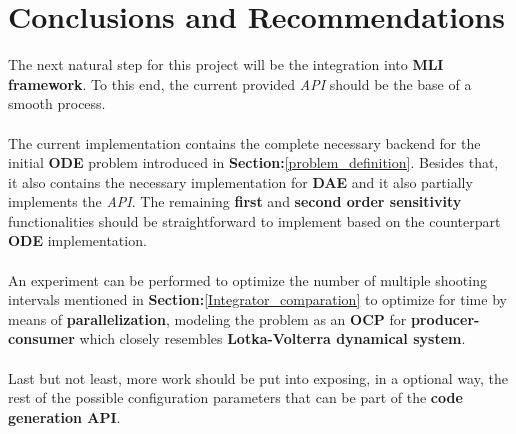 \documentclass[12pt, letterpaper]{article}
\begin{document}
\section{Conclusions and Recommendations}
\label{conclusions_recommandations}

The next natural step for this project will be the integration into \textbf{MLI framework}. To this end, the current provided \textit{API} should be the base of a smooth process. 
\\
\\
The current implementation contains the complete necessary backend for the initial \textbf{ODE} problem introduced in \textbf{Section:}\ref{problem_definition}. Besides that, it also contains the necessary implementation for \textbf{DAE} and it also partially implements the \textit{API}. The remaining \textbf{first} and \textbf{second order sensitivity} functionalities should be straightforward to implement based on the counterpart \textbf{ODE} implementation.
\\
\\
An experiment can be performed to optimize the number of multiple shooting intervals mentioned in \textbf{Section:}\ref{Integrator_comparation} to optimize for time by means of \textbf{parallelization}, modeling the problem as an \textbf{OCP} for \textbf{producer-consumer} which closely resembles \textbf{Lotka-Volterra dynamical system}.
\\
\\
Last but not least, more work should be put into exposing, in a optional way, the rest of the possible configuration parameters that can be part of the \textbf{code generation API}.
\\
\\
\\
\\
\\
\\
\\
\\
\\
\\
\\
\\

%




\end{document}
